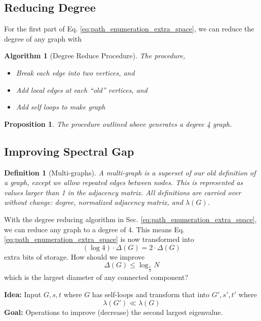 \documentclass[11pt, letter]{book}
\newtheorem{algorithm}{Algorithm}[chapter]
\newtheorem{proposition}{Proposition}[chapter]
\newtheorem{definition}{Definition}[chapter]
\begin{document}
\subsection{Reducing Degree} \label{sec:reducing_degree}
For the first part of Eq. \ref{eq:path_enumeration_extra_space}, we can reduce the degree of any graph with
\begin{mdframed}
	\begin{algorithm}[Degree Reduce Procedure] The procedure, 
		\begin{itemize}
			\item Break each edge into two vertices, and 
			\item Add local edges at each ``old'' vertices, and
			\item Add self loops to make graph
		\end{itemize}
	\end{algorithm}
\end{mdframed}

\begin{proposition}
	The procedure outlined above generates a degree 4 graph. 
\end{proposition}


\subsection{Improving Spectral Gap}
\begin{definition}[Multi-graphs]
	A multi-graph is a superset of our old definition of a graph, except we allow repeated edges between nodes. This is represented as values larger than 1 in the adjacency matrix. All definitions are carried over without change: degree, normalized adjacency matrix, and $\lambda (G)$.
\end{definition}

With the degree reducing algorithm in Sec. \ref{eq:path_enumeration_extra_space}, we can reduce any graph to a degree of 4. This means Eq. \ref{eq:path_enumeration_extra_space} is now transformed into
\begin{equation}
	( \log 4 ) \cdot \Delta (G) = 2 \cdot \Delta (G)
\end{equation}
extra bits of storage. How should we improve
\begin{equation}
	\Delta (G) \leq \log _{\frac{1}{\lambda}} N
\end{equation}
which is the largest diameter of any connected component?

\begin{mdframed}
	\textbf{Idea:} Input $G, s, t$ where $G$ has self-loops and transform that into $G', s', t'$ where 
	\begin{equation}
		\lambda (G') \ll \lambda (G)
	\end{equation}
	\textbf{Goal:} Operations to improve (decrease) the second largest eigenvalue. 
\end{mdframed}
\end{document}
